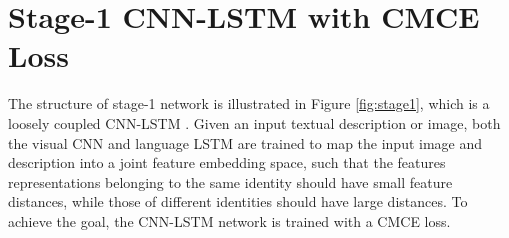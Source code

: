 
\section{Stage-1 CNN-LSTM with CMCE Loss}
The structure of stage-1 network is illustrated in Figure \ref{fig:stage1}, which is a loosely coupled CNN-LSTM . Given an input textual description or image, both the visual CNN and language LSTM are trained to map the input image and description into a joint feature embedding space, such that the features representations belonging to the same identity should have small feature distances, while those of different identities should have large distances. To achieve the goal, the CNN-LSTM network is trained with a CMCE loss.



